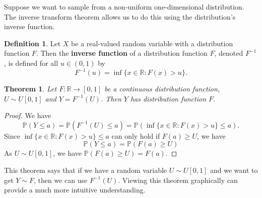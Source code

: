 \documentclass[
]{book}
\newtheorem{theorem}{Theorem}[chapter]
\theoremstyle{definition}
\newtheorem{definition}{Definition}[chapter]
\theoremstyle{definition}
\theoremstyle{definition}
\theoremstyle{definition}
\theoremstyle{remark}
\begin{document}
Suppose we want to sample from a non-uniform one-dimensional distribution. The inverse transform theorem allows us to do this using the distribution's inverse function.

\begin{definition}
Let \(X\) be a real-valued random variable with a distribution function \(F\). Then the \textbf{inverse function} of a distribution function \(F\), denoted \(F^{-1}\), is defined for all \(u \in (0, 1)\) by
\[
F^{-1}(u) = \inf\{x \in\mathbb{R} : F(x) > u\}.
\]
\end{definition}

\begin{theorem}
Let \(F :\mathbb{R} \rightarrow [0, 1]\) be a continuous distribution function, \(U \sim U[0, 1]\) and \(Y = F^{-1}(U)\). Then \(Y\) has distribution function \(F\).
\end{theorem}

\begin{proof}
We have
\[
\mathbb{P}(Y \leq a) = \mathbb{P}(F^{-1}(U) \leq a) = \mathbb{P}(\inf\{x \in\mathbb{R} : F(x) > u\} \leq a). 
\]
Since \(\inf\{x \in\mathbb{R} : F(x) > u\} \leq a\) can only hold if \(F(a) \geq U\), we have
\[
\mathbb{P}(Y \leq a)  = \mathbb{P}(F(a)\geq U)
\]
As \(U \sim U[0, 1]\), we have \(\mathbb{P}(F(a)\geq U) = F(a)\).
\end{proof}

This theorem says that if we have a random variable \(U \sim U[0, 1]\) and we want to get \(Y \sim F\), then we can use \(F^{-1}(U)\). Viewing this theorem graphically can provide a much more intuitive understanding.
\end{document}
